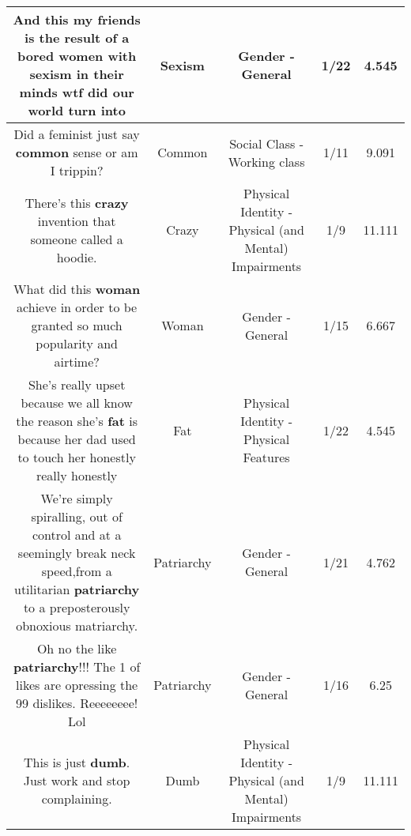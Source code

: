 \documentclass[11pt]{article}
\newlength\mylength
\begin{document}
\begin{center}
\begin{longtable}{|C{.65\mylength}|C{.30\mylength}|C{.12\mylength}|C{.12\mylength}|C{.12\mylength}|}
  \small And this my friends is the result of a bored women with \textbf{sexism} in their minds wtf did our world turn into\normalsize   & Sexism & Gender - General & 1/22 & 4.545 \\  \hline
  \small Did a feminist just say \textbf{common} sense or am I trippin?\normalsize   & Common & Social Class - Working class & 1/11 & 9.091 \\  \hline
  \small There's this \textbf{crazy} invention that someone called a hoodie.\normalsize   & Crazy & Physical Identity - Physical (and Mental) Impairments & 1/9 & 11.111 \\  \hline
  \small What did this \textbf{woman} achieve in order to be granted so much popularity and airtime?\normalsize   & Woman & Gender - General & 1/15 & 6.667 \\  \hline
  \small She's really upset because we all know the reason she's \textbf{fat} is because her dad used to touch her  honestly really honestly\normalsize   & Fat & Physical Identity - Physical Features & 1/22 & 4.545 \\  \hline
  \small We're simply spiralling, out of control and at a seemingly break neck speed,from a utilitarian \textbf{patriarchy} to a preposterously obnoxious matriarchy.\normalsize   & Patriarchy & Gender - General & 1/21 & 4.762 \\  \hline
  \small Oh no the like \textbf{patriarchy}!!! The 1 of likes are opressing the 99 dislikes. Reeeeeeee! Lol\normalsize   & Patriarchy & Gender - General & 1/16 & 6.25 \\  \hline
  \small This is just \textbf{dumb}. Just work and stop complaining.\normalsize   & Dumb & Physical Identity - Physical (and Mental) Impairments & 1/9 & 11.111 \\  \hline

\end{longtable}
\end{center}
\end{document}
